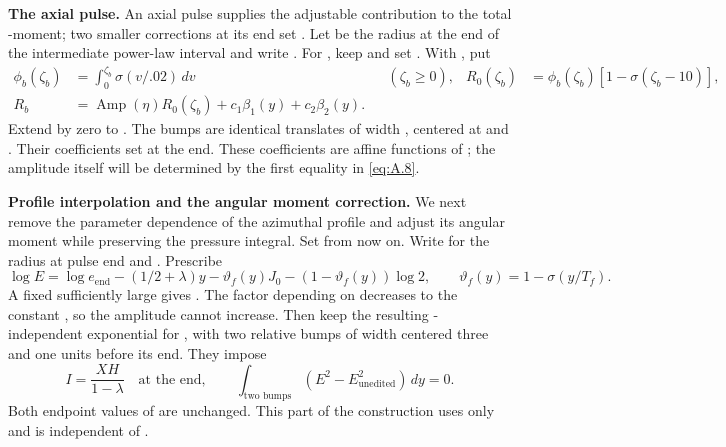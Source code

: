 %
\noindent\textbf{The axial pulse.} An axial pulse supplies the adjustable contribution to the total
-moment; two smaller corrections at its end set
. Let  be the radius at the end of the
intermediate power-law interval and write . For
, keep  and set
. With , put
\[
\begin{aligned}
\phi_b(\zeta_b)&=\int_0^{\zeta_b}\sigma(v/.02)\,dv
  &&(\zeta_b\ge0),
&R_0(\zeta_b)&=\phi_b(\zeta_b)[1-\sigma(\zeta_b-10)],\\
R_b&=\operatorname{Amp}(\eta)R_0(\zeta_b)+c_1\beta_1(y)+c_2\beta_2(y).
\end{aligned}
\]
Extend  by zero to . The bumps
 are identical translates of width
, centered at  and
. Their coefficients
 set  at the end. These coefficients
are affine functions of ; the amplitude itself will be
determined by the first equality in \eqref{eq:A.8}.

\noindent\textbf{Profile interpolation and the angular moment correction.} We next remove the
parameter dependence of the azimuthal profile and adjust its angular moment while preserving the
pressure integral. Set  from now on. Write
 for the radius at pulse end and
. Prescribe
\begin{equation}
\log E=\log e_{\mathrm{end}}-(1/2+\lambda)y-\vartheta_f(y)J_0
 -(1-\vartheta_f(y))\log2,
\qquad
\vartheta_f(y)=1-\sigma(y/T_f).
\tag{A.10}\label{eq:A.10}
\end{equation}
A fixed sufficiently large  gives
. The factor depending on
 decreases to the constant , so the
amplitude cannot increase. Then keep the resulting -independent
exponential for , with two relative
 bumps of width  centered three and one units
before its end. They impose
\begin{equation}
I=\frac{XH}{1-\lambda}\quad\text{at the end},
\qquad
\int_{\text{two bumps}}(E^2-E_{\mathrm{unedited}}^2)\,dy=0.
\tag{A.11}\label{eq:A.11}
\end{equation}
Both endpoint values of  are unchanged. This part of the construction uses
 only and is independent of .

